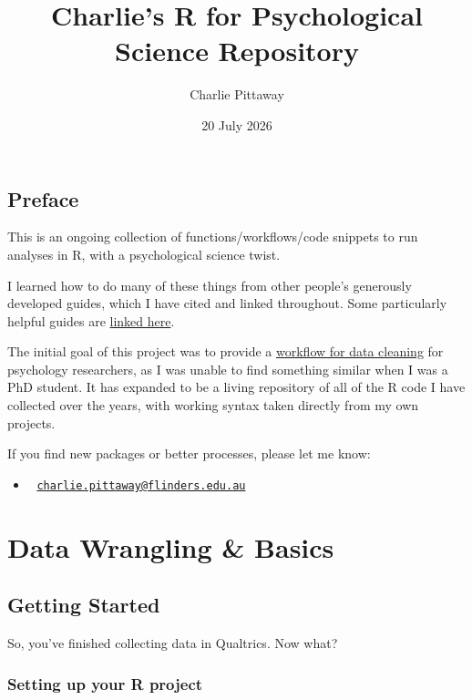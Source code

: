 \documentclass[
  letterpaper,
  DIV=11,
  numbers=noendperiod]{scrreprt}
\title{Charlie's R for Psychological Science Repository}
\author{Charlie Pittaway}
\date{20 July 2026}
\providecommand{\tightlist}{%
  \setlength{\itemsep}{0pt}\setlength{\parskip}{0pt}}\usepackage{longtable,booktabs,array}
\renewcommand*\contentsname{Table of contents}
\newcommand\contentsname{Table of contents}
\begin{document}
\maketitle

\renewcommand*\contentsname{Table of contents}
{
\hypersetup{linkcolor=}
\setcounter{tocdepth}{2}
\tableofcontents
}


\chapter*{Preface}\label{preface}


This is an ongoing collection of functions/workflows/code snippets to
run analyses in R, with a psychological science twist.

I learned how to do many of these things from other people's generously
developed guides, which I have cited and linked throughout. Some
particularly helpful guides are \href{guides.qmd}{linked here}.

The initial goal of this project was to provide a
\href{data-cleaning-overview.qmd}{workflow for data cleaning} for
psychology researchers, as I was unable to find something similar when I
was a PhD student. It has expanded to be a living repository of all of
the R code I have collected over the years, with working syntax taken
directly from my own projects.

If you find new packages or better processes, please let me know:

\begin{itemize}
\tightlist
\item
  📧
  \href{mailto:charlie.pittaway@flinders.edu.au}{\nolinkurl{charlie.pittaway@flinders.edu.au}}
\end{itemize}

\part{Data Wrangling \& Basics}

\chapter{Getting Started}\label{getting-started}

So, you've finished collecting data in Qualtrics. Now what?

\section{Setting up your R project}\label{setting-up-your-r-project}
\end{document}
